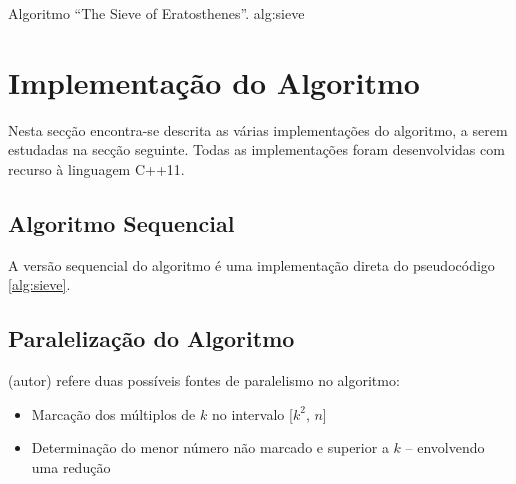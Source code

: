 \documentclass[a4paper]{article}
\begin{document}
 
{Algoritmo ``The Sieve of Eratosthenes''.} {alg:sieve}
 
 
\section{Implementação do Algoritmo}
 
Nesta secção encontra-se descrita as várias implementações do algoritmo, a serem estudadas na secção seguinte. Todas as implementações foram desenvolvidas com recurso à linguagem C++11.
 
\subsection{Algoritmo Sequencial}
 
A versão sequencial do algoritmo é uma implementação direta do pseudocódigo \ref{alg:sieve}.
 
\subsection{Paralelização do Algoritmo}
 
(autor) refere duas possíveis fontes de paralelismo no algoritmo:
 
\begin{itemize}
    \item Marcação dos múltiplos de $k$ no intervalo [$k^2$, $n$]
    \item Determinação do menor número não marcado e superior a $k$ -- envolvendo uma redução
\end{itemize}
 
\end{document}
